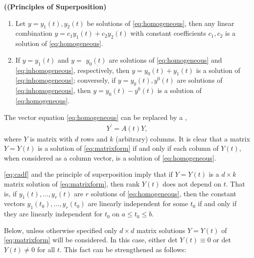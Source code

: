 \documentclass{article}
\newcommand{\bfs}[1]{\textbf{({#1}) }}
\begin{document}
\begin{thma}\bfs{(Principles of Superposition}\label{thm:linearSuperposition}
 \begin{enumerate}
     \item Let $y=y_{1}(t), y_{2}(t)$ be solutions of \cref{eq:homogeneous}, then any linear combination $y=c_{1} y_{1}(t)+c_{2} y_{2}(t)$ with constant coefficients $c_{1}, c_{2}$ is a solution of \cref{eq:homogeneous}.
     \item If $y=y_{1}(t)$ and $y=$ $y_{0}(t)$ are solutions of \cref{eq:homogeneous} and \cref{eq:inhomogeneous}, respectively, then $y=y_{0}(t)+y_{1}(t)$ is a solution of \cref{eq:inhomogeneous}; conversely, if $y=y_{0}(t), y^{0}(t)$ are solutions of \cref{eq:inhomogeneous}, then $y=y_{0}(t)-y^{0}(t)$ is a solution of \cref{eq:homogeneous}.
 \end{enumerate}
\end{thma}

The vector equation \cref{eq:homogeneous} can be replaced by a ,
\begin{align}
Y^{\prime}=A(t) Y, \label{eq:matrixform}
\end{align}
where $Y$ is matrix with $d$ rows and $k$ (arbitrary) columns. It is clear that a matrix $Y=Y(t)$ is a solution of \cref{eq:matrixform} if and only if each column of $Y(t)$, when considered as a column vector, is a solution of \cref{eq:homogeneous}.

\begin{cora}
\cref{eq:cadf} and the principle of superposition imply that if $Y=Y(t)$ is a $d \times k$ matrix solution of \cref{eq:matrixform}, then rank $Y(t)$ does not depend on $t$. That is, if $y_{1}(t), \ldots, y_{r}(t)$ are $r$ solutions of \cref{eq:homogeneous}, then the constant vectors $y_{1}\left(t_{0}\right), \ldots, y_{r}\left(t_{0}\right)$ are linearly independent for some $t_{0}$ if and only if they are linearly independent for  $t_{0}$ on $a \le t_{0} \le b$.
\end{cora}


Below, unless otherwise specified only $d \times d$ matrix solutions $Y=Y(t)$ of \cref{eq:matrixform} will be considered. In this case, either det $Y(t) \equiv 0$ or det $Y(t) \neq 0$ for all $t$. This fact can be strengthened as follows:
\end{document}
